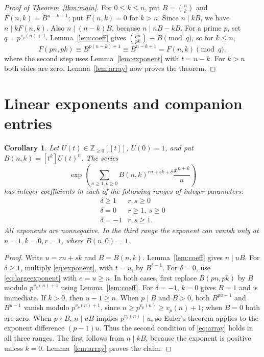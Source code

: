 \documentclass[11pt]{article}
\newtheorem{corollary}[theorem]{Corollary}
\newcommand{\Z}{\mathbb Z}
\newcommand{\vp}{v_p}
\begin{document}
\begin{proof}[Proof of Theorem~\ref{thm:main}]
For $0\leq k\leq n$, put $B=\binom nk$ and $F(n,k)=B^{n-k+1}$;
put $F(n,k)=0$ for $k>n$. Since $n\mid kB$, we have $n\mid kF(n,k)$.
Also $n\mid(n-k)B$, because $n\mid nB-kB$.
For a prime $p$, set $q=p^{\vp(n)+1}$. Lemma~\ref{lem:coeff} gives
$\binom{pn}{pk}\equiv B\pmod q$, so for $k\leq n$,
\[
 F(pn,pk)\equiv B^{p(n-k)+1}
   \equiv B^{n-k+1}=F(n,k)\pmod q,
\]
where the second step uses Lemma~\ref{lem:exponent} with $t=n-k$.
For $k>n$ both sides are zero. Lemma~\ref{lem:array} now proves the theorem.
\end{proof}

\section{Linear exponents and companion entries}
\begin{corollary}\label{cor:linear}
Let $U(t)\in\Z_{\geq0}[[t]]$, $U(0)=1$, and put
$B(n,k)=[t^k]U(t)^n$. The series
\[
 \exp\!\left(\sum_{n\geq1,k\geq0}
 B(n,k)^{rn+sk+\delta}\frac{x^{n+k}}n\right)
\]
has integer coefficients in each of the following ranges of integer parameters:
\[
\begin{array}{c|c}
\delta\geq1 & r,s\geq0\\
\delta=0 & r\geq1,\ s\geq0\\
\delta=-1 & r,s\geq1.
\end{array}
\]
All exponents are nonnegative. In the third range the exponent can vanish
only at $n=1,k=0,r=1$, where $B(n,0)=1$.
\end{corollary}
\begin{proof}
Write $u=rn+sk$ and $B=B(n,k)$. Lemma~\ref{lem:coeff} gives
$n\mid uB$. For $\delta\geq1$, multiply \eqref{eq:exponent}, with
$t=u$, by $B^{\delta-1}$. For $\delta=0$, use
\eqref{eq:largeexponent} with $e=u\geq n$.
In both cases, first replace $B(pn,pk)$ by $B$ modulo
$p^{\vp(n)+1}$ using Lemma~\ref{lem:coeff}.
For $\delta=-1$, $k=0$ gives $B=1$ and is immediate. If $k>0$, then
$u-1\geq n$. When $p\mid B$ and $B>0$, both
$B^{pu-1}$ and $B^{u-1}$ vanish modulo $p^{\vp(n)+1}$,
since $n\geq p^{\vp(n)}\geq\vp(n)+1$; when $B=0$ both are zero.
When $p\nmid B$, $n\mid uB$ implies $p^{\vp(n)}\mid u$,
so Euler's theorem applies to the exponent difference $(p-1)u$.
Thus the second condition of \eqref{eq:array} holds in all three ranges.
The first follows from $n\mid kB$, because the exponent is positive
unless $k=0$. Lemma~\ref{lem:array} proves the claim.
\end{proof}
\end{document}
